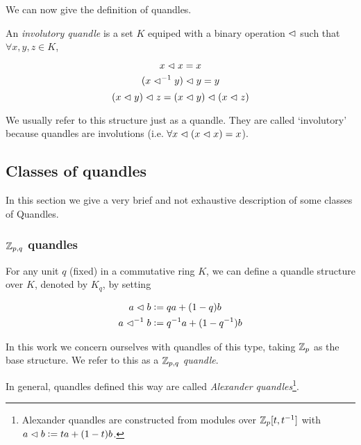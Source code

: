 \documentclass[paper.tex]{subfiles}
\begin{document}
We can now give the definition of quandles.

\begin{definition}
An \emph{involutory quandle} is a set $K$ equiped with a binary operation $\vartriangleleft$ such that $\forall x,y,z \in K$,

\begin{equation}
	x \vartriangleleft x = x
\end{equation}
\begin{equation}
	(x \vartriangleleft^{-1} y) \vartriangleleft y = y \\
\end{equation}
\begin{equation}
	(x \vartriangleleft y) \vartriangleleft z = (x \vartriangleleft y) \vartriangleleft (x \vartriangleleft z) \\
\end{equation}

We usually refer to this structure just as a quandle. They are called `involutory' because quandles are involutions (i.e. $\forall x \vartriangleleft (x \vartriangleleft x) = x$).

\end{definition}

\subsection{Classes of quandles}

In this section we give a very brief and not exhaustive description of some classes of Quandles.

\subsubsection{$\mathbb{Z}_{p,q}$ quandles}
\label{sec:alexander}

For any unit $q$ (fixed) in a commutative ring $K$, we can define a quandle structure over $K$, denoted by $K_q$, by setting

\begin{align}
  a \vartriangleleft b &\vcentcolon= q a + (1 - q)b \\
  a \vartriangleleft^{-1} b &\vcentcolon= q^{-1} a + (1 - q^{-1})b
\end{align}

In this work we concern ourselves with quandles of this type, taking $\mathbb{Z}_p$ as the base structure. We refer to this as a \emph{$\mathbb{Z}_{p,q}$ quandle}.

In general, quandles defined this way are called \emph{Alexander quandles}\footnote{Alexander quandles are constructed from modules over $\mathbb{Z}_p[t,t^{-1}]$ with $a \vartriangleleft b \vcentcolon= t a + (1 - t) b$.}.
\end{document}
